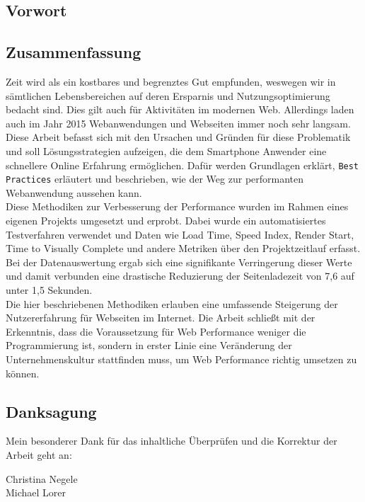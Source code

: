 \begin{newpage}
	\hline
	\vspace*{\fill}
	\section*{Vorwort}
	\subsection*{Zusammenfassung}
		Zeit wird als ein kostbares und begrenztes Gut empfunden, weswegen wir in sämtlichen Lebensbereichen auf deren Ersparnis und Nutzungsoptimierung bedacht sind. Dies gilt auch für Aktivitäten im modernen Web. Allerdings laden auch im Jahr 2015 Webanwendungen und Webseiten immer noch sehr langsam. Diese Arbeit befasst sich mit den Ursachen und Gründen für diese Problematik und soll Lösungsstrategien aufzeigen, die dem Smartphone Anwender eine schnellere Online Erfahrung ermöglichen. Dafür werden Grundlagen erklärt, \texttt{Best Practices} erläutert und beschrieben, wie der Weg zur performanten Webanwendung aussehen kann.\\
		Diese Methodiken zur Verbesserung der Performance wurden im Rahmen eines eigenen Projekts umgesetzt und erprobt. Dabei wurde ein automatisiertes Testverfahren verwendet und Daten wie Load Time, Speed Index, Render Start, Time to Visually Complete und andere Metriken über den Projektzeitlauf erfasst. Bei der Datenauswertung ergab sich eine signifikante Verringerung dieser Werte und damit verbunden eine drastische Reduzierung der Seitenladezeit von 7,6 auf unter 1,5 Sekunden.\\
		Die hier beschriebenen Methodiken erlauben eine umfassende Steigerung der Nutzererfahrung für Webseiten im Internet. Die Arbeit schließt mit der Erkenntnis, dass die Voraussetzung für Web Performance weniger die Programmierung ist, sondern in erster Linie eine Veränderung der Unternehmenskultur stattfinden muss, um Web Performance richtig umsetzen zu können.

	\subsection*{Danksagung}
		Mein besonderer Dank für das inhaltliche Überprüfen und die Korrektur der Arbeit geht an:
    \begin{flushleft}\large
		  \hspace*{0.5cm} Christina Negele\\
		  \hspace*{0.5cm} Michael Lorer
    \end{flushleft}
\end{newpage}


\newpage